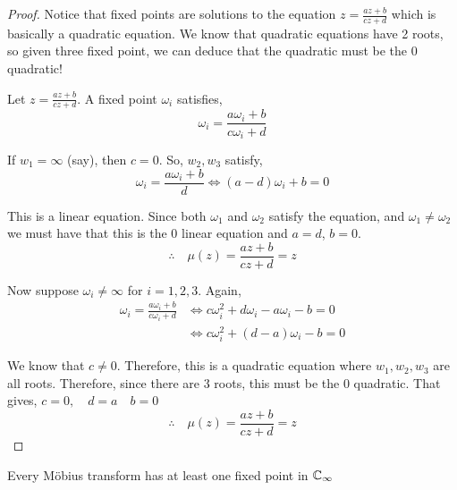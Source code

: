 \documentclass{article}
\begin{document}
\begin{proof}
    Notice that fixed points are solutions to the equation $z = \frac{az + b}{cz + d}$ which is basically a quadratic equation. We know that quadratic equations have 2 roots, so given three fixed point, we can deduce that the quadratic must be the $0$ quadratic!

    Let $z = \frac{az + b}{cz + d}$. A fixed point $\omega_i$ satisfies,
    \[
        \omega_i = \frac{a\omega_i + b}{c\omega_i + d}
    \]

    If $w_1 = \infty$ (say), then $c = 0$. So, $w_2, w_3$ satisfy,
    \[
        \omega_i = \frac{a\omega_i + b}{d} \Leftrightarrow (a - d)\omega_i + b = 0
    \]

    This is a linear equation. Since both $\omega_1$ and $\omega_2$ satisfy the equation, and $\omega_1 \neq \omega_2$ we must have that this is the $0$ linear equation and $a = d$, $b = 0$.
    \[
        \therefore \quad \mu(z) = \frac{az + b}{cz + d} = z  
    \]

    Now suppose $\omega_i \neq \infty$ for $i = 1, 2, 3$. Again,
    \begin{align*}
        \omega_i = \frac{a\omega_i + b}{c\omega_i + d} &\Leftrightarrow c \omega_i^2 + d\omega_i - a\omega_i - b = 0 \\
        &\Leftrightarrow c \omega_i^2 + (d - a)\omega_i - b = 0
    \end{align*}

    We know that $c \neq 0$. Therefore, this is a quadratic equation where $w_1, w_2, w_3$ are all roots. Therefore, since there are $3$ roots, this must be the $0$ quadratic. 
    That gives, $c = 0, \quad d = a \quad b = 0$
    \[
        \therefore \quad \mu(z) = \frac{az + b}{cz + d} = z  
    \]
\end{proof}

\begin{ex}
    Every M\"obius transform has at least one fixed point in $\mathbb{C}_\infty$
\end{ex}
\end{document}
